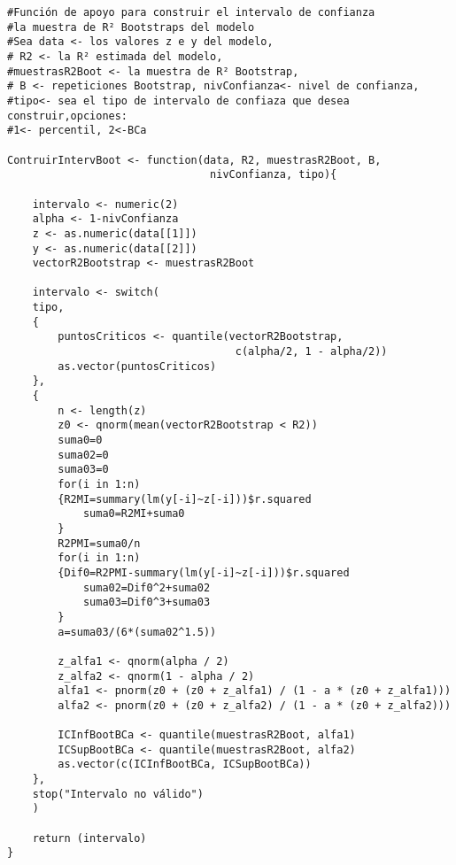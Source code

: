 \begin{verbatim}
#Función de apoyo para construir el intervalo de confianza 
#la muestra de R² Bootstraps del modelo
#Sea data <- los valores z e y del modelo,
# R2 <- la R² estimada del modelo, 
#muestrasR2Boot <- la muestra de R² Bootstrap,
# B <- repeticiones Bootstrap, nivConfianza<- nivel de confianza,
#tipo<- sea el tipo de intervalo de confiaza que desea construir,opciones:
#1<- percentil, 2<-BCa

ContruirIntervBoot <- function(data, R2, muestrasR2Boot, B, 
								nivConfianza, tipo){
	
	intervalo <- numeric(2) 
	alpha <- 1-nivConfianza
	z <- as.numeric(data[[1]])
	y <- as.numeric(data[[2]])
	vectorR2Bootstrap <- muestrasR2Boot
	
	intervalo <- switch(
	tipo,
	{
		puntosCriticos <- quantile(vectorR2Bootstrap, 
									c(alpha/2, 1 - alpha/2))
		as.vector(puntosCriticos)
	},
	{
		n <- length(z)
		z0 <- qnorm(mean(vectorR2Bootstrap < R2))
		suma0=0
		suma02=0
		suma03=0
		for(i in 1:n)
		{R2MI=summary(lm(y[-i]~z[-i]))$r.squared
			suma0=R2MI+suma0
		}
		R2PMI=suma0/n
		for(i in 1:n)
		{Dif0=R2PMI-summary(lm(y[-i]~z[-i]))$r.squared
			suma02=Dif0^2+suma02
			suma03=Dif0^3+suma03
		}
		a=suma03/(6*(suma02^1.5))
		
		z_alfa1 <- qnorm(alpha / 2)
		z_alfa2 <- qnorm(1 - alpha / 2)
		alfa1 <- pnorm(z0 + (z0 + z_alfa1) / (1 - a * (z0 + z_alfa1)))
		alfa2 <- pnorm(z0 + (z0 + z_alfa2) / (1 - a * (z0 + z_alfa2)))
		
		ICInfBootBCa <- quantile(muestrasR2Boot, alfa1)
		ICSupBootBCa <- quantile(muestrasR2Boot, alfa2)
		as.vector(c(ICInfBootBCa, ICSupBootBCa))
	},
	stop("Intervalo no válido")
	)
	
	return (intervalo)
}
\end{verbatim}



